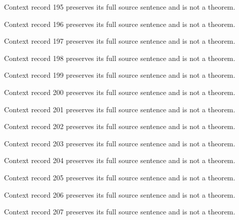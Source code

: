 \documentclass{article}
\begin{document}
\begin{remark}\label{train:context:195}Context record 195 preserves its full source sentence and is not a theorem.\end{remark}
\begin{remark}\label{train:context:196}Context record 196 preserves its full source sentence and is not a theorem.\end{remark}
\begin{remark}\label{train:context:197}Context record 197 preserves its full source sentence and is not a theorem.\end{remark}
\begin{remark}\label{train:context:198}Context record 198 preserves its full source sentence and is not a theorem.\end{remark}
\begin{remark}\label{train:context:199}Context record 199 preserves its full source sentence and is not a theorem.\end{remark}
\begin{remark}\label{train:context:200}Context record 200 preserves its full source sentence and is not a theorem.\end{remark}
\begin{remark}\label{train:context:201}Context record 201 preserves its full source sentence and is not a theorem.\end{remark}
\begin{remark}\label{train:context:202}Context record 202 preserves its full source sentence and is not a theorem.\end{remark}
\begin{remark}\label{train:context:203}Context record 203 preserves its full source sentence and is not a theorem.\end{remark}
\begin{remark}\label{train:context:204}Context record 204 preserves its full source sentence and is not a theorem.\end{remark}
\begin{remark}\label{train:context:205}Context record 205 preserves its full source sentence and is not a theorem.\end{remark}
\begin{remark}\label{train:context:206}Context record 206 preserves its full source sentence and is not a theorem.\end{remark}
\begin{remark}\label{train:context:207}Context record 207 preserves its full source sentence and is not a theorem.\end{remark}
\end{document}
